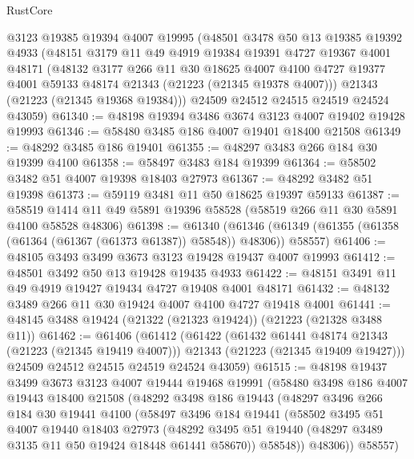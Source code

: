 \begin{lexlean}{RustCore}
\begin{coremodule}
    @3123
    @19385
    @19394
    @4007
    @19995
    (@48501
      @3478
      @50
      @13
      @19385
      @19392
      @4933
      (@48151
        @3179
        @11
        @49
        @4919
        @19384
        @19391
        @4727
        @19367
        @4001
        @48171
        (@48132
          @3177
          @266
          @11
          @30
          @18625
          @4007
          @4100
          @4727
          @19377
          @4001
          @59133
          @48174
          @21343
          (@21223 (@21345 @19378 @4007)))
        @21343
        (@21223 (@21345 @19368 @19384)))
      @24509
      @24512
      @24515
      @24519
      @24524
      @43059)
@61340 := @48198 @19394 @3486 @3674 @3123 @4007 @19402 @19428 @19993
@61346 := @58480 @3485 @186 @4007 @19401 @18400 @21508
@61349 := @48292 @3485 @186 @19401
@61355 := @48297 @3483 @266 @184 @30 @19399 @4100
@61358 := @58497 @3483 @184 @19399
@61364 := @58502 @3482 @51 @4007 @19398 @18403 @27973
@61367 := @48292 @3482 @51 @19398
@61373 := @59119 @3481 @11 @50 @18625 @19397 @59133
@61387 := @58519 @1414 @11 @49 @5891 @19396 @58528 (@58519 @266 @11 @30 @5891 @4100 @58528 @48306)
@61398 := @61340
    (@61346 (@61349 (@61355 (@61358 (@61364 (@61367 (@61373 @61387)) @58548)) @48306)) @58557)
@61406 := @48105 @3493 @3499 @3673 @3123 @19428 @19437 @4007 @19993
@61412 := @48501 @3492 @50 @13 @19428 @19435 @4933
@61422 := @48151 @3491 @11 @49 @4919 @19427 @19434 @4727 @19408 @4001 @48171
@61432 := @48132 @3489 @266 @11 @30 @19424 @4007 @4100 @4727 @19418 @4001
@61441 := @48145 @3488 @19424 (@21322 (@21323 @19424)) (@21223 (@21328 @3488 @11))
@61462 := @61406
    (@61412
      (@61422
        (@61432 @61441 @48174 @21343 (@21223 (@21345 @19419 @4007)))
        @21343
        (@21223 (@21345 @19409 @19427)))
      @24509
      @24512
      @24515
      @24519
      @24524
      @43059)
@61515 := @48198
    @19437
    @3499
    @3673
    @3123
    @4007
    @19444
    @19468
    @19991
    (@58480
      @3498
      @186
      @4007
      @19443
      @18400
      @21508
      (@48292
        @3498
        @186
        @19443
        (@48297
          @3496
          @266
          @184
          @30
          @19441
          @4100
          (@58497
            @3496
            @184
            @19441
            (@58502
              @3495
              @51
              @4007
              @19440
              @18403
              @27973
              (@48292 @3495 @51 @19440 (@48297 @3489 @3135 @11 @50 @19424 @18448 @61441 @58670))
              @58548))
          @48306))
      @58557)

\end{coremodule}
\end{lexlean}
